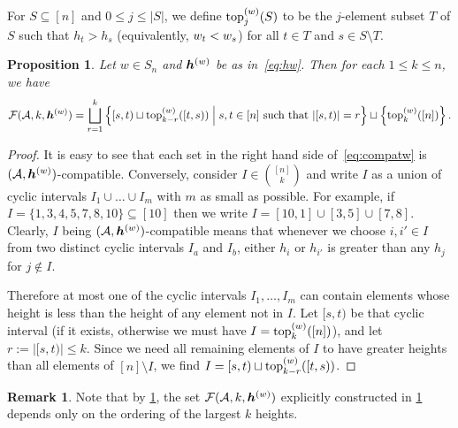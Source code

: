 \documentclass[11pt]{amsart}
\theoremstyle{plain}
\newtheorem{proposition}[theorem]{Proposition}
\theoremstyle{definition}
\newtheorem{remark}[theorem]{Remark}
\def\A{\mathcal{A}}
\let\subset\subseteq
\begin{document}
For $S\subset[n]$ and $0\leq j\leq |S|$, we define $\operatorname{top}^{(w)}_{j}(S)$ to be the $j$-element subset $T$ of $S$ such that $h_t>h_s$ (equivalently, $w_t<w_s$) for all $t\in T$ and $s\in S\setminus T$.

\begin{proposition}
\label{prop:WSS}
Let $w\in S_n$ and ${\bm{h}}^{(w)}$ be as in~\eqref{eq:hw}. Then for each $1 \leq k \leq n$, we have
\begin{equation}
  \Compatw=\bigsqcup_{r=1}^k \left\{[s,t)\sqcup \TOP{k-r}{[t,s)}\;\middle|\; s,t\in[n]\text{ such that }|[s,t)|=r \right\} \sqcup\left\{\TOP{k}{[n]}\right\}.\label{eq:compatw}
\end{equation}

\end{proposition}
\begin{proof}
It is easy to see that each set in the right hand side of~\eqref{eq:compatw} is $(\A,\hw)$-compatible. Conversely, consider $I\in{[n]\choose k}$ and write $I$ as a union of cyclic intervals
        $I_1 \cup \dots \cup I_m$ with $m$ as small as possible.  For example, if
        $I = \{1, 3,4,5, 7,8,10\} \subset [10]$ then we write
        $I = [10,1] \cup [3,5] \cup [7,8]$.
        Clearly, $I$ being $(\A,\hw)$-compatible means that whenever we choose
        $i, i'\in I$ from two distinct cyclic intervals $I_a$ and $I_b$,
        either $h_i$ or $h_{i'}$ is greater than any $h_j$ for
        $j\notin I$.

        Therefore at most one of the cyclic intervals $I_1, \dots, I_m$
        can contain elements whose height is less than the height of
        any element not in $I$. Let $[s,t)$ be that cyclic interval (if it exists, otherwise we must have $I=\operatorname{top}^{(w)}_{k}([n])$), and let $r:=|[s,t)|\leq k$. Since we need all remaining elements of $I$ to have greater
        heights than all elements of $[n]\setminus I$,
        we find $I=[s,t)\sqcup \operatorname{top}^{(w)}_{k-r}([t,s))$.
\end{proof}


\begin{remark}
Note that by 
\cref{prop:WSS}, the set  
	$\Compatw$  explicitly constructed in \cref{prop:WSS}
	depends only on the ordering of the
largest $k$ heights.
\end{remark}
\end{document}
